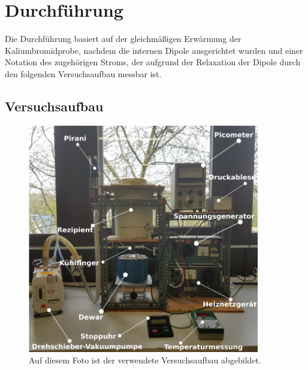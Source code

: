 \section{Durchführung}
\label{sec:Durchführung}

Die Durchführung basiert auf der gleichmäßigen Erwärmung der Kaliumbromidprobe,
nachdem die internen Dipole ausgerichtet wurden und einer Notation des 
zugehörigen Stroms, der aufgrund der Relaxation der Dipole durch den folgenden 
Versuchsaufbau messbar ist.

\subsection{Versuchsaufbau}

\begin{figure}
    \centering
    \includegraphics[width=0.9\textwidth, keepaspectratio]{figure/AufbauFoto.png}
    \caption{Auf diesem Foto ist der verwendete Versuchsaufbau abgebildet. 
    \cite{sample}}
    \label{abb1}
\end{figure}

